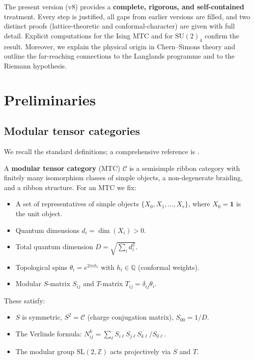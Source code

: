 \documentclass[12pt,a4paper]{article}
\theoremstyle{definition}
\theoremstyle{remark}
\begin{document}
The present version (v8) provides a \textbf{complete, rigorous, and self-contained}
treatment. Every step is justified, all gaps from earlier versions are filled, and
two distinct proofs (lattice-theoretic and conformal-character) are given with full
detail. Explicit computations for the Ising MTC and for $\mathrm{SU}(2)_4$ confirm
the result. Moreover, we explain the physical origin in Chern--Simons theory and
outline the far-reaching connections to the Langlands programme and to the Riemann
hypothesis.


\section{Preliminaries}

\subsection{Modular tensor categories}

We recall the standard definitions; a comprehensive reference is \cite{BK,Turaev}.

A \textbf{modular tensor category} (MTC) $\mathcal{C}$ is a semisimple ribbon
category with finitely many isomorphism classes of simple objects, a non-degenerate
braiding, and a ribbon structure. For an MTC we fix:
\begin{itemize}
  \item A set of representatives of simple objects $\{X_0,X_1,\dots,X_r\}$, where
    $X_0=\mathbf{1}$ is the unit object.
  \item Quantum dimensions $d_i = \dim(X_i) > 0$.
  \item Total quantum dimension $D = \sqrt{\sum_i d_i^2}$.
  \item Topological spins $\theta_i = e^{2\pi i h_i}$ with $h_i\in\mathbb{Q}$
    (conformal weights).
  \item Modular $S$-matrix $S_{ij}$ and $T$-matrix $T_{ij}=\delta_{ij}\theta_i$.
\end{itemize}

These satisfy:
\begin{itemize}
  \item $S$ is symmetric, $S^2 = \mathcal{C}$ (charge conjugation matrix),
    $S_{00} = 1/D$.
  \item The Verlinde formula:
    $N_{ij}^k = \sum_\ell S_{i\ell}S_{j\ell}\overline{S_{k\ell}}/S_{0\ell}$.
  \item The modular group $\mathrm{SL}(2,\mathbb{Z})$ acts projectively via $S$
    and $T$.
\end{itemize}
\end{document}
